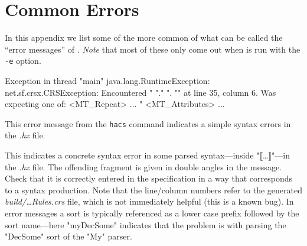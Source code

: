 \documentclass[11pt]{article} %
\begin{document}


\section{Common Errors}\label{app:errors}

In this appendix we list some of the more common of what can be called the ``error messages'' of
\HAX. \emph{Note} that most of these only come out when \HAX is run with the \verb'-e' option.

\begin{error}\leavevmode
\begin{code}
Exception in thread "main" java.lang.RuntimeException: net.sf.crsx.CRSException:
 Encountered " "." ". "" at line 35, column 6.
Was expecting one of:
    <MT_Repeat> ...
    "%
    <MT_Attributes> ...
\end{code}
This error message from the \verb'hacs' command indicates a simple syntax errors in the \emph{.hx}
file.
\end{error}

\begin{error}\leavevmode
{}
  This indicates a concrete syntax error in some parsed syntax---inside "⟦…⟧"---in the \emph{.hx}
  file. The offending fragment is given in double angles in the message. Check that it is correctly
  entered in the \HAX specification in a way that corresponds to a syntax production. Note that the
  line/column numbers refer to the generated \emph{build/…Rules.crs} file, which is not immediately
  helpful (this is a known bug). In error messages a sort is typically referenced as a lower case
  prefix followed by the sort name---here "myDecSome" indicates that the problem is with parsing the
  "DecSome" sort of the "My" parser.
\end{error}
\end{document}
